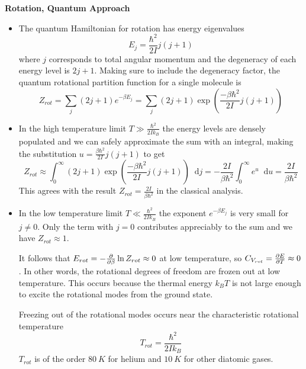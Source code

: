 \documentclass[11pt, a4paper]{article}
\newcommand{\diff}{\mathop{}\!\mathrm{d}} %
\begin{document}
\textbf{Rotation, Quantum Approach}
\begin{itemize}
	\item The quantum Hamiltonian for rotation has energy eigenvalues
	\begin{equation*}
		E_{j} = \frac{\hbar^{2}}{2I}j(j+1)
	\end{equation*}
	where $ j $ corresponds to total angular momentum and the degeneracy of each energy level is $ 2j + 1 $. Making sure to include the degeneracy factor, the quantum rotational partition function for a single molecule is
	\begin{equation*}
		Z_{rot} = \sum_{j} (2j + 1)e^{-\beta E_{j}} =  \sum_{j} (2j + 1) \exp(\frac{-\beta\hbar^{2}}{2I}j(j+1))
	\end{equation*}
	
	\item In the high temperature limit $ T \gg \frac{\hbar^{2}}{2Ik_{B}} $ the energy levels are densely populated and we can safely approximate the sum with an integral, making the substitution $  u = \frac{\beta \hbar^{2}}{2I}j(j+1) $ to get
	\begin{equation*}
		Z_{rot} \approx \int_{0}^{\infty}(2j + 1) \exp(\frac{-\beta\hbar^{2}}{2I}j(j+1)) \diff j = - \frac{2I}{\beta\hbar^{2}} \int_{0}^{\infty} e^{u}\diff u=  \frac{2I}{\beta \hbar^{2}}
	\end{equation*}
	This agrees with the result $ Z_{rot} = \frac{2I}{\beta \hbar^{2}} $ in the classical analysis.
	
	\item In the low temperature limit $ T \ll \frac{\hbar^{2}}{2Ik_{B}} $ the exponent $ e^{-\beta E_{j}} $ is very small for $ j \neq 0 $. Only the term with $ j = 0 $ contributes appreciably to the sum and we have $ Z_{rot} \approx 1 $.
	
	It follows that $ E_{rot} = -\pdv{}{\beta}\ln Z_{rot} \approx 0 $ at low temperature, so $ C_{V_{rot}} = \pdv{E}{T} \approx 0 $. In other words, the rotational degrees of freedom are frozen out at low temperature. This occurs because the thermal energy $ k_{B}T $ is not large enough to excite the rotational modes from the ground state. 
	
	Freezing out of the rotational modes occurs near the characteristic rotational temperature
	\begin{equation*}
		 T_{rot} = \frac{\hbar^2}{2Ik_B}
	\end{equation*}
	$ T_{rot} $ is of the order $ \SI{80}{K} $ for helium and $ \SI{10}{K} $ for other diatomic gases.

\end{itemize}
\end{document}
